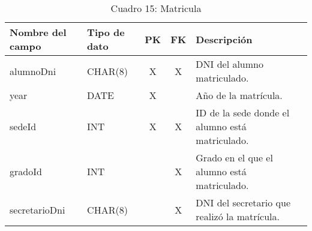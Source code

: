 \begin{table}[H]
	\centering
	\begin{tabular}{|l|l|c|c|l|}
		\hline
		\textbf{Nombre del campo} & \textbf{Tipo de dato} & \textbf{PK} & \textbf{FK} & \textbf{Descripción}                            \\
		\hline
		alumnoDni                 & CHAR(8)               & X           & X           & DNI del alumno matriculado.                     \\
		\hline
		year                      & DATE                  & X           &             & Año de la matrícula.                            \\
		\hline
		sedeId                    & INT                   & X           & X           & ID de la sede donde el alumno está matriculado. \\
		\hline
		gradoId                   & INT                   &             & X           & Grado en el que el alumno está matriculado.     \\
		\hline
		secretarioDni             & CHAR(8)               &             & X           & DNI del secretario que realizó la matrícula.    \\
		\hline
	\end{tabular}
	\caption{Cuadro 15: Matricula}
\end{table}